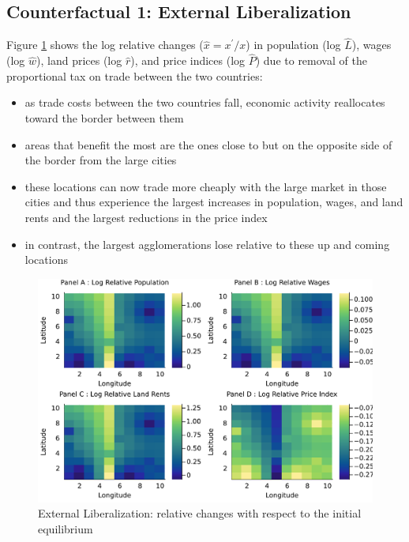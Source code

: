 \documentclass[11pt]{article}
\begin{document}
\subsection*{Counterfactual 1: External Liberalization}
Figure \ref{counter_1} shows the log relative changes ($\hat{x} = x^{'}/x$) in population (log $\hat{L}$), wages (log $\hat{w}$), land prices (log $\hat{r}$), and price indices (log $\hat{P}$) due to removal of the proportional tax on trade between the two countries:
\begin{itemize}
\item as trade costs between the two countries fall, economic activity reallocates toward the border between them
\item areas that benefit the most are the ones close to but on the opposite side of the border from the large cities
\item these locations can now trade more cheaply with the large market in those cities and thus experience the largest increases in population, wages, and land rents and the largest reductions in the price index
\item in contrast, the largest agglomerations lose relative to these up and coming locations
\end{itemize}


\begin{figure}[H]
\caption{External Liberalization: relative changes with respect to the initial equilibrium}
\centering
\label{counter_1}
\includegraphics[scale=0.8]{../graph/H_cnty_c.pdf}
\end{figure}
\end{document}
